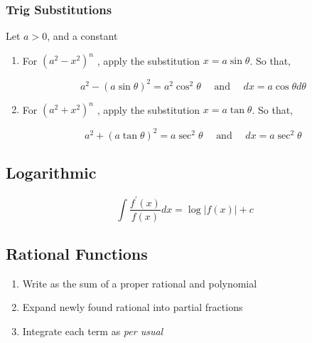 \documentclass[english,course]{Notes}
\newcommand{\ita}[1]{\textit{#1}}
\begin{document}
\subsubsection{Trig Substitutions} 

\par{Let $a > 0$, and a constant}

\begin{enumerate}
\item For $(a^{2} - x^{2})^{n}$ , apply the substitution $\boxed{x = a\sin\theta}$. So that,

$$a^{2} - (a\sin\theta)^{2} = a^{2}\cos^{2}\theta \quad \text{ and } \quad dx = a\cos\theta d\theta$$

\item For $(a^{2} + x^{2})^{n}$ , apply the substitution $\boxed{ x = a\tan\theta}$. So that,

$$a^{2} + (a\tan\theta)^{2} = a\sec^{2}\theta \quad \text{ and } \quad dx = a\sec^{2}\theta $$

\end{enumerate}
\subsection{Logarithmic}

\begin{theorem} $$ \int \frac{f^{\prime}(x)}{f(x)} d x=\log |f(x)|+c $$ \end{theorem}


\subsection{Rational Functions} 


\begin{enumerate}

\item Write as the sum of a proper rational and polynomial
\item Expand newly found rational into partial fractions 
\item Integrate each term as \ita{per usual}

\end{enumerate}
\end{document}
